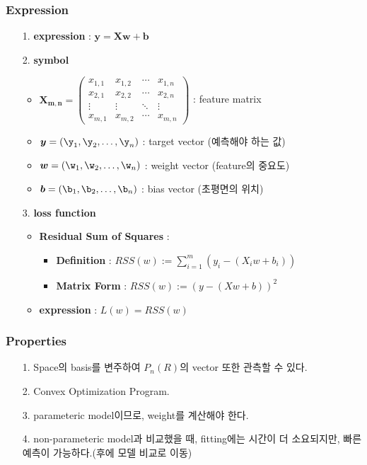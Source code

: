 \documentclass{article}
\begin{document}
\subsubsection{Expression}
\begin{itemize}
    \item[1.] \textbf{expression} : $\boldsymbol{y = Xw+b}$
    
    \item[2.] \textbf{symbol} 
    \begin{itemize}
        \item $\boldsymbol{X_{m,n}} = 
                \begin{pmatrix}
                x_{1,1} & x_{1,2} & \cdots & x_{1,n} \\
                x_{2,1} & x_{2,2} & \cdots & x_{2,n} \\
                \vdots  & \vdots  & \ddots & \vdots  \\
                x_{m,1} & x_{m,2} & \cdots & x_{m,n}
                \end{pmatrix}$ : feature matrix
                
        \item $\boldsymbol{y} = (\y_1,\y_2,\dots,\y_n)$ : target vector (예측해야 하는 값)
        \item $\boldsymbol{w} = (\w_1,\w_2,\dots,\w_n)$ : weight vector (feature의 중요도)
        \item $\boldsymbol{b} = (\b_1,\b_2,\dots,\b_n)$ : bias vector (초평면의 위치)
    \end{itemize}
    
    \item[3.] \textbf{loss function}
    \begin{itemize}
        \item \textbf{Residual Sum of Squares} : 
            \begin{itemize}
                \item \textbf{Definition} : $RSS(w) := \sum_{i=1}^{m} (y_i - (X_iw+b_i))$
                \item \textbf{Matrix Form} : $RSS(w) := (y-(Xw+b))^2$
            \end{itemize}
        \item \textbf{expression} : $L(w) = RSS(w)$
    \end{itemize}
\end{itemize}

\subsubsection{Properties}
\begin{itemize}
    \item [1.] Space의 basis를 변주하여 $P_n(R)$의 vector 또한 관측할 수 있다.
    \item [2.] Convex Optimization Program.
    \item[3.] parameteric model이므로, weight를 계산해야 한다.
    \item[4.] non-parameteric model과 비교했을 때, fitting에는 시간이 더 소요되지만, 빠른 예측이 가능하다.(후에 모델 비교로 이동)
\end{itemize}
\end{document}

